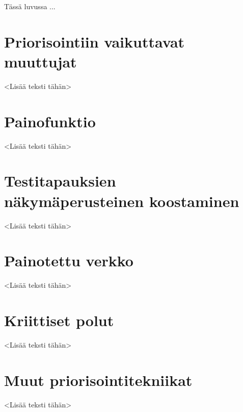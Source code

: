 Tässä luvussa ...

\section{Priorisointiin vaikuttavat muuttujat}

<Lisää teksti tähän>

\section{Painofunktio}

<Lisää teksti tähän>

\section{Testitapauksien näkymäperusteinen koostaminen}

<Lisää teksti tähän>

\section{Painotettu verkko}

<Lisää teksti tähän>

\section{Kriittiset polut}

<Lisää teksti tähän>

\section{Muut priorisointitekniikat}

<Lisää teksti tähän>

